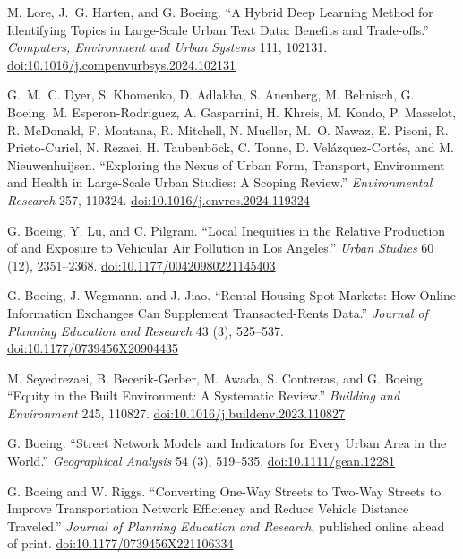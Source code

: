 \begin{tablist}
        \item[2024] \tab{}M. Lore, J.~G. Harten, and G. Boeing. \enquote{A Hybrid Deep Learning Method for Identifying Topics in Large-Scale Urban Text Data: Benefits and Trade-offs.} \textit{Computers, Environment and Urban Systems} 111, 102131. \href{https://doi.org/10.1016/j.compenvurbsys.2024.102131}{doi:10.1016/j.compenvurbsys.2024.102131}

        \item[2024] \tab{}G.~M.~C. Dyer, S. Khomenko, D. Adlakha, S. Anenberg, M. Behnisch, G. Boeing, M. Esperon-Rodriguez, A. Gasparrini, H. Khreis, M. Kondo, P. Masselot, R. McDonald, F. Montana, R. Mitchell, N. Mueller, M.~O. Nawaz, E. Pisoni, R. Prieto-Curiel, N. Rezaei, H. Taubenböck, C. Tonne, D. Velázquez-Cortés, and M. Nieuwenhuijsen. \enquote{Exploring the Nexus of Urban Form, Transport, Environment and Health in Large-Scale Urban Studies: A Scoping Review.} \textit{Environmental Research} 257, 119324. \href{https://doi.org/10.1016/j.envres.2024.119324}{doi:10.1016/j.envres.2024.119324}

        \item[2023] \tab{}G. Boeing, Y. Lu, and C. Pilgram. \enquote{Local Inequities in the Relative Production of and Exposure to Vehicular Air Pollution in Los Angeles.} \textit{Urban Studies} 60 (12), 2351--2368. \href{https://doi.org/10.1177/00420980221145403}{doi:10.1177/00420980221145403}

        \item[2023] \tab{}G. Boeing, J. Wegmann, and J. Jiao. \enquote{Rental Housing Spot Markets: How Online Information Exchanges Can Supplement Transacted-Rents Data.} \textit{Journal of Planning Education and Research} 43 (3), 525--537. \href{https://doi.org/10.1177/0739456X20904435}{doi:10.1177/0739456X20904435}

        \item[2023] \tab{}M. Seyedrezaei, B. Becerik-Gerber, M. Awada, S. Contreras, and G. Boeing. \enquote{Equity in the Built Environment: A Systematic Review.} \textit{Building and Environment} 245, 110827. \href{https://doi.org/10.1016/j.buildenv.2023.110827}{doi:10.1016/j.buildenv.2023.110827}

        \item[2022] \tab{}G. Boeing. \enquote{Street Network Models and Indicators for Every Urban Area in the World.} \textit{Geographical Analysis} 54 (3), 519--535. \href{https://doi.org/10.1111/gean.12281}{doi:10.1111/gean.12281}

        \item[2022] \tab{}G. Boeing and W. Riggs. \enquote{Converting One-Way Streets to Two-Way Streets to Improve Transportation Network Efficiency and Reduce Vehicle Distance Traveled.} \textit{Journal of Planning Education and Research}, published online ahead of print. \href{https://doi.org/10.1177/0739456X221106334}{doi:10.1177/0739456X221106334}


\end{tablist}
